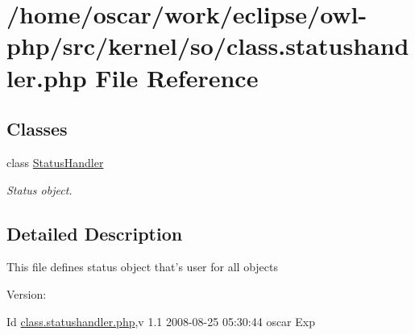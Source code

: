 \hypertarget{class_8statushandler_8php}{
\section{/home/oscar/work/eclipse/owl-php/src/kernel/so/class.statushandler.php File Reference}
\label{class_8statushandler_8php}
}
\subsection*{Classes}
\begin{CompactItemize}
\item 
class \hyperlink{classStatusHandler}{StatusHandler}
\begin{CompactList}\small\item\em Status object. \item\end{CompactList}\end{CompactItemize}


\subsection{Detailed Description}
This file defines status object that's user for all objects \begin{Desc}
\item[Version:]\end{Desc}
\begin{Desc}
\item[Id]\hyperlink{class_8statushandler_8php}{class.statushandler.php},v 1.1 2008-08-25 05:30:44 oscar Exp \end{Desc}
